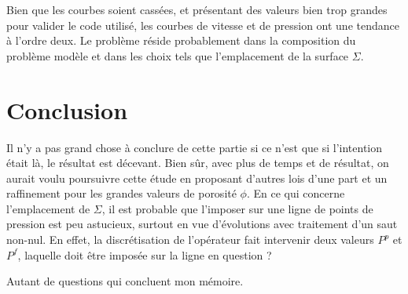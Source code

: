 Bien que les courbes soient cassées, et présentant des valeurs bien trop grandes pour valider le code utilisé, les courbes de vitesse et de pression ont une tendance à l'ordre deux. Le problème réside probablement dans la composition du problème modèle et dans les choix tels que l'emplacement de la surface $\Sigma$.

\section{Conclusion}

Il n'y a pas grand chose à conclure de cette partie si ce n'est que si l'intention était là, le résultat est décevant. Bien sûr, avec plus de temps et de résultat, on aurait voulu poursuivre cette étude en proposant d'autres lois d'une part et un raffinement pour les grandes valeurs de porosité $\phi$. En ce qui concerne l'emplacement de $\Sigma$, il est probable que l'imposer sur une ligne de points de pression est peu astucieux, surtout en vue d'évolutions avec traitement d'un saut non-nul. En effet, la discrétisation de l'opérateur fait intervenir deux valeurs $P^p$ et $P^f$, laquelle doit être imposée sur la ligne en question ?

Autant de questions qui concluent mon mémoire.